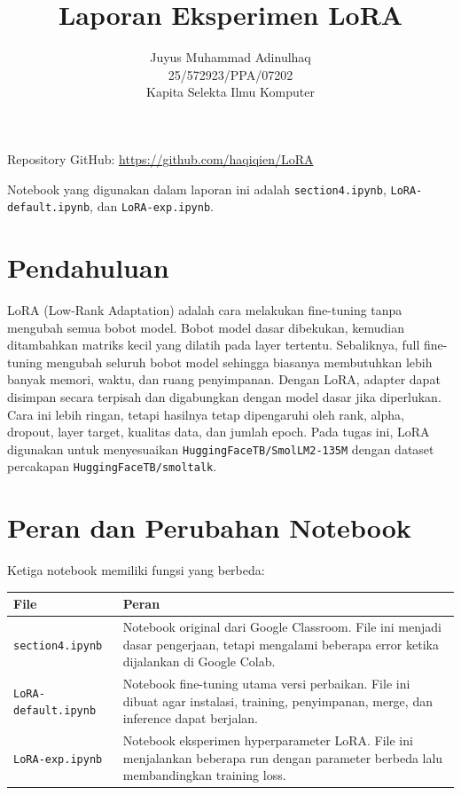 \documentclass[12pt,a4paper]{article}
\title{Laporan Eksperimen LoRA}
\author{Juyus Muhammad Adinulhaq\\25/572923/PPA/07202\\Kapita Selekta Ilmu Komputer}
\date{}
\begin{document}
\maketitle

Repository GitHub: \href{https://github.com/haqiqien/LoRA}{https://github.com/haqiqien/LoRA}

Notebook yang digunakan dalam laporan ini adalah \texttt{section4.ipynb},
\texttt{LoRA-default.ipynb}, dan \texttt{LoRA-exp.ipynb}.

\section{Pendahuluan}

LoRA (Low-Rank Adaptation) adalah cara melakukan fine-tuning tanpa mengubah
semua bobot model. Bobot model dasar dibekukan, kemudian ditambahkan matriks
kecil yang dilatih pada layer tertentu. Sebaliknya, full fine-tuning mengubah
seluruh bobot model sehingga biasanya membutuhkan lebih banyak memori, waktu,
dan ruang penyimpanan. Dengan LoRA, adapter dapat disimpan secara terpisah dan
digabungkan dengan model dasar jika diperlukan. Cara ini lebih ringan, tetapi
hasilnya tetap dipengaruhi oleh rank, alpha, dropout, layer target, kualitas
data, dan jumlah epoch. Pada tugas ini, LoRA digunakan untuk menyesuaikan
\texttt{HuggingFaceTB/SmolLM2-135M} dengan dataset percakapan
\texttt{HuggingFaceTB/smoltalk}.

\section{Peran dan Perubahan Notebook}

Ketiga notebook memiliki fungsi yang berbeda:

\begin{longtable}{p{} p{}}
\toprule
\textbf{File} & \textbf{Peran} \\
\midrule
\texttt{section4.ipynb} & Notebook original dari Google Classroom. File ini menjadi dasar pengerjaan, tetapi mengalami beberapa error ketika dijalankan di Google Colab. \\
\texttt{LoRA-default.ipynb} & Notebook fine-tuning utama versi perbaikan. File ini dibuat agar instalasi, training, penyimpanan, merge, dan inference dapat berjalan. \\
\texttt{LoRA-exp.ipynb} & Notebook eksperimen hyperparameter LoRA. File ini menjalankan beberapa run dengan parameter berbeda lalu membandingkan training loss. \\
\bottomrule
\end{longtable}
\end{document}
